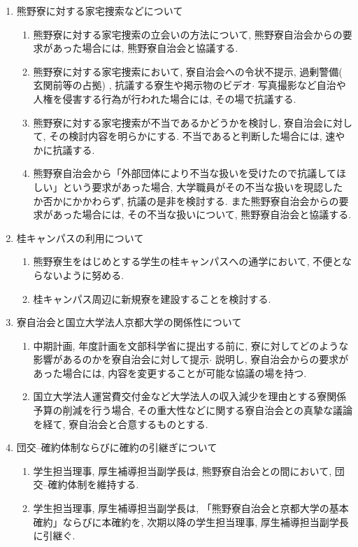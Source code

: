 \documentclass[10pt,b5jsbook,dvips,dvipdfmx,openany]{jsbook}
\theoremstyle{definition}
\begin{document}
\begin{shadebox}
\begin{enumerate}
\begin{enumerate}
			\end{enumerate}
		\item 熊野寮に対する家宅捜索などについて
			\begin{enumerate}
			\renewcommand{\labelenumii}{(\arabic{enumii})}
			\item 熊野寮に対する家宅捜索の立会いの方法について, 熊野寮自治会からの要求があった場合には, 熊野寮自治会と協議する.
			\item 熊野寮に対する家宅捜索において, 寮自治会への令状不提示, 過剰警備( 玄関前等の占拠) , 抗議する寮生や掲示物のビデオ$ \cdot $ 写真撮影など自治や人権を侵害する行為が行われた場合には, その場で抗議する.
			\item 熊野寮に対する家宅捜索が不当であるかどうかを検討し, 寮自治会に対して, その検討内容を明らかにする. 不当であると判断した場合には, 速やかに抗議する.
			\item 熊野寮自治会から「外部団体により不当な扱いを受けたので抗議してほしい」という要求があった場合, 大学職員がその不当な扱いを現認したか否かにかかわらず, 抗議の是非を検討する. また熊野寮自治会からの要求があった場合には, その不当な扱いについて, 熊野寮自治会と協議する.
			\end{enumerate}
		\item 桂キャンパスの利用について
			\begin{enumerate}
			\renewcommand{\labelenumii}{(\arabic{enumii})}
			\item 熊野寮生をはじめとする学生の桂キャンパスへの通学において, 不便とならないように努める.
			\item 桂キャンパス周辺に新規寮を建設することを検討する.
			\end{enumerate}
		\item 寮自治会と国立大学法人京都大学の関係性について
			\begin{enumerate}
			\renewcommand{\labelenumii}{(\arabic{enumii})}
			\item 中期計画, 年度計画を文部科学省に提出する前に, 寮に対してどのような影響があるのかを寮自治会に対して提示$ \cdot $ 説明し, 寮自治会からの要求があった場合には, 内容を変更することが可能な協議の場を持つ.
			\item 国立大学法人運営費交付金など大学法人の収入減少を理由とする寮関係予算の削減を行う場合, その重大性などに関する寮自治会との真摯な議論を経て, 寮自治会と合意するものとする.
			\end{enumerate}
		\item 団交--確約体制ならびに確約の引継ぎについて
			\begin{enumerate}
			\renewcommand{\labelenumii}{(\arabic{enumii})}
			\item 学生担当理事, 厚生補導担当副学長は, 熊野寮自治会との間において, 団交--確約体制を維持する.
			\item 学生担当理事, 厚生補導担当副学長は, 「熊野寮自治会と京都大学の基本確約」ならびに本確約を, 次期以降の学生担当理事, 厚生補導担当副学長に引継ぐ.
			\end{enumerate}
		\end{enumerate}

		\end{shadebox}
\end{document}
